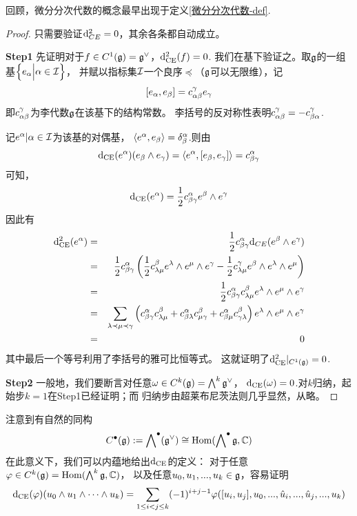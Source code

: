 回顾，微分分次代数的概念最早出现于定义\ref{微分分次代数-def}.

\begin{proof}
只需要验证$\mathrm{d}_{CE}^2=0$，其余各条都自动成立。

\textbf{Step1}
先证明对于$f\in C^1(\mathfrak{g})=\mathfrak{g}^\vee$，$\mathrm{d}_{\operatorname{CE}}^2(f)=0$.
我们在基下验证之。取$\mathfrak{g}$的一组基$\Big\{ e_\alpha \Big| \alpha\in\mathcal{I} \Big\}$，
并赋以指标集$\mathcal{I}$一个良序$\preceq$（$\mathfrak{g}$可以无限维），记
$$[e_\alpha,e_\beta]=c_{\alpha\beta}^\gamma e_\gamma$$
即$c_{\alpha\beta}^\gamma$为李代数$\mathfrak{g}$在该基下的结构常数。
李括号的反对称性表明$c_{\alpha\beta}^\gamma=-c_{\beta\alpha}^\gamma$.

记${e^\alpha|\alpha\in\mathcal{I}}$为该基的对偶基，
$\langle e^\alpha,e_\beta \rangle=\delta^\alpha_\beta$.则由
$$
  \mathrm{d}_{\operatorname{CE}}(e^\alpha)(e_\beta\wedge e_\gamma)
= \langle e^\alpha,[e_\beta,e_\gamma] \rangle
= c^\alpha_{\beta\gamma}
$$
可知，
$$\mathrm{d}_{\operatorname{CE}}(e^\alpha)=\frac{1}{2}c_{\beta\gamma}^\alpha e^\beta\wedge e^\gamma$$
因此有
\begin{eqnarray*}
     \mathrm{d}_{\operatorname{CE}}^2(e^\alpha)
&=&
     \frac{1}{2}
     c_{\beta\gamma}^\alpha
     \mathrm{d}_{CE}(e^\beta\wedge e^\gamma)\\
&=&
     \frac{1}{2}
     c_{\beta\gamma}^\alpha
     \left(
       \frac{1}{2}
       c^\beta_{\lambda\mu}
       e^\lambda\wedge e^\mu\wedge e^\gamma
      -\frac{1}{2}
       c^\gamma_{\lambda\mu}
       e^\beta\wedge e^\lambda\wedge e^\mu
     \right)\\
&=&
     \frac{1}{2}
     c^\alpha_{\beta\gamma}
     c^\beta_{\lambda\mu}
     e^\lambda\wedge e^\mu\wedge e^\gamma\\
&=&
     \sum_{\lambda\prec\mu\prec\gamma}
       \left(
         c^\alpha_{\beta\gamma}
         c^\beta_{\lambda\mu}
        +c^\alpha_{\beta\lambda}
         c^\beta_{\mu\gamma}
        +c^\alpha_{\beta\mu}
         c^\beta_{\gamma\lambda}
       \right)
       e^\lambda\wedge e^\mu\wedge e^\gamma\\
&=&
     0
\end{eqnarray*}
其中最后一个等号利用了李括号的雅可比恒等式。
这就证明了$\mathrm{d}_{\operatorname{CE}}^2|_{C^1(\mathfrak{g})}=0$.

\textbf{Step2}
一般地，我们要断言对任意$\omega\in C^k(\mathfrak{g})=\bigwedge\nolimits^{k}\mathfrak{g}^\vee$，
$\mathrm{d}_{\operatorname{CE}}(\omega)=0$.对$k$归纳，起始步$k=1$在Step1已经证明；而
归纳步由超莱布尼茨法则几乎显然，从略。
\end{proof}

\begin{rem}注意到有自然的同构
$$C^{\bullet}(\mathfrak{g}):=\bigwedge\nolimits^{\bullet}(\mathfrak{g}^\vee)
\cong\operatorname{Hom}(\bigwedge\nolimits^{\bullet}\mathfrak{g},\mathbb{C})$$
在此意义下，我们可以内蕴地给出$\mathrm{d}_{\operatorname{CE}}$的定义：
对于任意$\varphi\in C^k(\mathfrak{g})=\operatorname{Hom}(\bigwedge\nolimits^{k}\mathfrak{g},\mathbb{C})$，
以及任意$u_0,u_1,...,u_k\in\mathfrak{g}$，容易证明
$$
  \mathrm{d}_{\operatorname{CE}}(\varphi)(u_0\wedge u_1\wedge \cdots\wedge u_k)
=
  \sum_{1\leq i<j\leq k}
    (-1)^{i+j-1}
    \varphi([u_i,u_j],u_0,...,\hat{u}_i,...,\hat{u}_j,...,u_{k})
$$
\end{rem}

